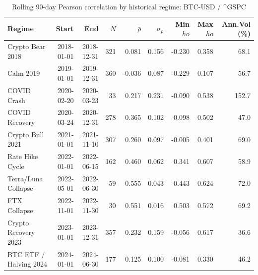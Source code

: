 \begin{table}[H]
\centering
\small
\caption{Rolling 90-day Pearson correlation by historical regime: BTC-USD / ^GSPC}
\label{tab:regime_corr_BTCUSDGSPC}
\begin{tabular}{lrrrrrrrr}
\toprule
Regime & Start & End & $N$ & $\bar{\rho}$ & $\sigma_\rho$ & Min $
ho$ & Max $
ho$ & Ann.Vol (\%) \\
\midrule
Crypto Bear 2018 & 2018-01-01 & 2018-12-31 & 321 & 0.081 & 0.156 & -0.230 & 0.358 & 68.1 \\
Calm 2019 & 2019-01-01 & 2019-12-31 & 360 & -0.036 & 0.087 & -0.229 & 0.107 & 56.7 \\
COVID Crash & 2020-02-20 & 2020-03-23 & 33 & 0.217 & 0.231 & -0.090 & 0.538 & 152.7 \\
COVID Recovery & 2020-03-24 & 2020-12-31 & 278 & 0.365 & 0.102 & 0.098 & 0.502 & 47.0 \\
Crypto Bull 2021 & 2021-01-01 & 2021-11-10 & 307 & 0.260 & 0.097 & -0.005 & 0.401 & 69.0 \\
Rate Hike Cycle & 2022-01-01 & 2022-06-15 & 162 & 0.460 & 0.062 & 0.341 & 0.607 & 58.9 \\
Terra/Luna Collapse & 2022-05-01 & 2022-06-30 & 59 & 0.555 & 0.043 & 0.443 & 0.624 & 72.0 \\
FTX Collapse & 2022-11-01 & 2022-11-30 & 30 & 0.551 & 0.016 & 0.503 & 0.572 & 69.2 \\
Crypto Recovery 2023 & 2023-01-01 & 2023-12-31 & 357 & 0.232 & 0.159 & -0.056 & 0.617 & 36.6 \\
BTC ETF / Halving 2024 & 2024-01-01 & 2024-06-30 & 177 & 0.125 & 0.100 & -0.081 & 0.330 & 46.2 \\
\bottomrule
\end{tabular}
\end{table}